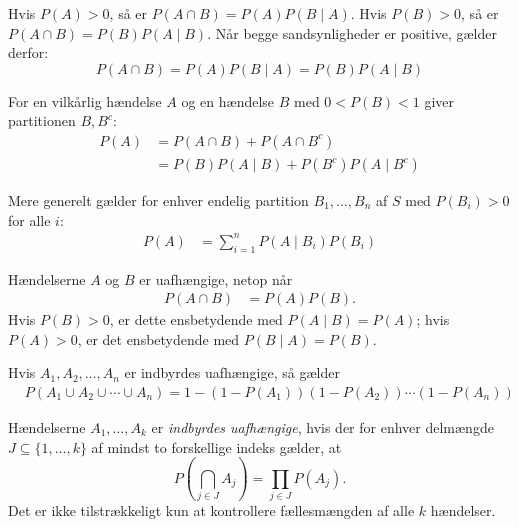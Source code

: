 \begin{theorem}[Multiplikationsreglen]
    Hvis $P(A)>0$, så er $P(A\cap B)=P(A)P(B\mid A)$. Hvis $P(B)>0$, så er $P(A\cap B)=P(B)P(A\mid B)$. Når begge sandsynligheder er positive, gælder derfor:
    \[
    P(A \cap B) = P(A) P(B \mid A) = P(B) P(A \mid B)
    \]
\end{theorem}

\begin{theorem}
For en vilkårlig hændelse \(A\) og en hændelse \(B\) med $0<P(B)<1$ giver partitionen $B,B^c$:
    \begin{align*}
    P(A) &= P(A \cap B) + P(A \cap B^c) \\
    &= P(B) P(A \mid B) + P(B^c) P(A \mid B^c)
    \end{align*}

    Mere generelt gælder for enhver endelig partition \(B_1,\ldots,B_n\) af $S$ med $P(B_i)>0$ for alle $i$:
    \begin{align*}
    P(A) &= \sum_{i=1}^{n} P(A \mid B_i) P(B_i)
    \end{align*}
\end{theorem}

\begin{definition}[Uafhængighed]
    Hændelserne \(A\) og \(B\) er uafhængige, netop når
    \begin{align*}
        P(A \cap B) &= P(A)P(B).
    \end{align*}
    Hvis $P(B)>0$, er dette ensbetydende med $P(A\mid B)=P(A)$; hvis $P(A)>0$, er det ensbetydende med $P(B\mid A)=P(B)$.
\end{definition}

\begin{theorem}
        Hvis \( A_1, A_2, \ldots, A_n \) er indbyrdes uafhængige, så gælder
        \begin{align*}
        &P\left(A_1 \cup A_2 \cup \cdots \cup A_n\right)=1-\left(1-P\left(A_1\right)\right)\left(1-P\left(A_2\right)\right) \cdots\left(1-P\left(A_n\right)\right)
        \end{align*}
\end{theorem}

\begin{definition}
    Hændelserne \(A_1,\ldots,A_k\) er \emph{indbyrdes uafhængige}, hvis der for enhver delmængde $J\subseteq\{1,\ldots,k\}$ af mindst to forskellige indeks gælder, at
    \[
      P\!\left(\bigcap_{j\in J}A_j\right)=\prod_{j\in J}P(A_j).
    \]
    Det er ikke tilstrækkeligt kun at kontrollere fællesmængden af alle $k$ hændelser.
\end{definition}

